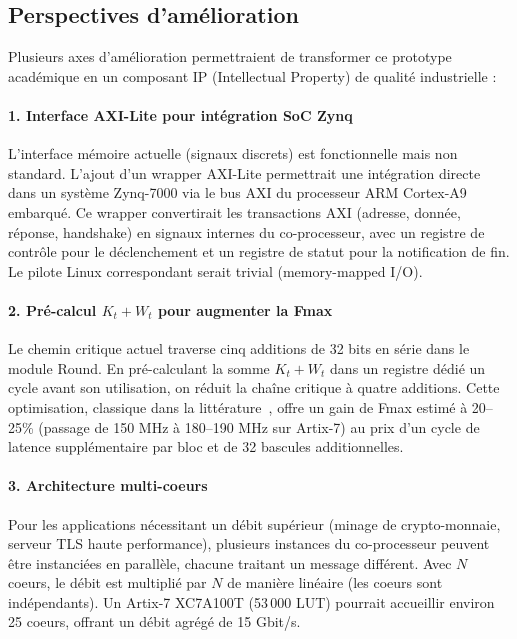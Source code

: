 \subsection{Perspectives d'amélioration}

Plusieurs axes d'amélioration permettraient de transformer ce prototype académique en un composant IP (Intellectual Property) de qualité industrielle :

\paragraph{1. Interface AXI-Lite pour intégration SoC Zynq} L'interface mémoire actuelle (signaux discrets) est fonctionnelle mais non standard. L'ajout d'un wrapper AXI-Lite permettrait une intégration directe dans un système Zynq-7000 via le bus AXI du processeur ARM Cortex-A9 embarqué. Ce wrapper convertirait les transactions AXI (adresse, donnée, réponse, handshake) en signaux internes du co-processeur, avec un registre de contrôle pour le déclenchement et un registre de statut pour la notification de fin. Le pilote Linux correspondant serait trivial (memory-mapped I/O).

\paragraph{2. Pré-calcul $K_t + W_t$ pour augmenter la Fmax} Le chemin critique actuel traverse cinq additions de 32 bits en série dans le module Round. En pré-calculant la somme $K_t + W_t$ dans un registre dédié un cycle avant son utilisation, on réduit la chaîne critique à quatre additions. Cette optimisation, classique dans la littérature~\cite{dadda}, offre un gain de Fmax estimé à 20--25\% (passage de 150 MHz à 180--190 MHz sur Artix-7) au prix d'un cycle de latence supplémentaire par bloc et de 32 bascules additionnelles.

\paragraph{3. Architecture multi-coeurs} Pour les applications nécessitant un débit supérieur (minage de crypto-monnaie, serveur TLS haute performance), plusieurs instances du co-processeur peuvent être instanciées en parallèle, chacune traitant un message différent. Avec $N$ coeurs, le débit est multiplié par $N$ de manière linéaire (les coeurs sont indépendants). Un Artix-7 XC7A100T (53\,000 LUT) pourrait accueillir environ 25 coeurs, offrant un débit agrégé de 15 Gbit/s.

